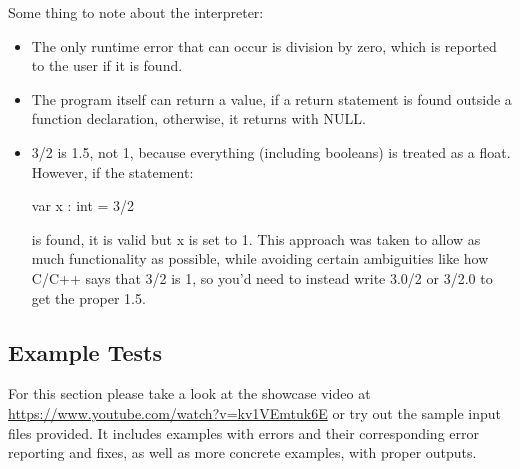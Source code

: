 Some thing to note about the interpreter:
\begin{itemize}
	\item The only runtime error that can occur is division by zero, which is reported to the user if it is found.
	\item The program itself can return a value, if a return statement is found outside a function declaration, otherwise, it returns with NULL.
	\item 3/2 is 1.5, not 1, because everything (including booleans) is treated as a float. However, if the statement:
	\begin{center}var x : int = 3/2 \end{center}
	is found, it is valid but x is set to 1. This approach was taken to allow as much functionality as possible, while avoiding certain ambiguities like how C/C++ says that 3/2 is 1, so you'd need to instead write 3.0/2 or 3/2.0 to get the proper 1.5.
\end{itemize}

\subsection{Example Tests}
For this section please take a look at the showcase video at \url{https://www.youtube.com/watch?v=kv1VEmtuk6E} or try out the sample input files provided. It includes examples with errors and their corresponding error reporting and fixes, as well as more concrete examples, with proper outputs.